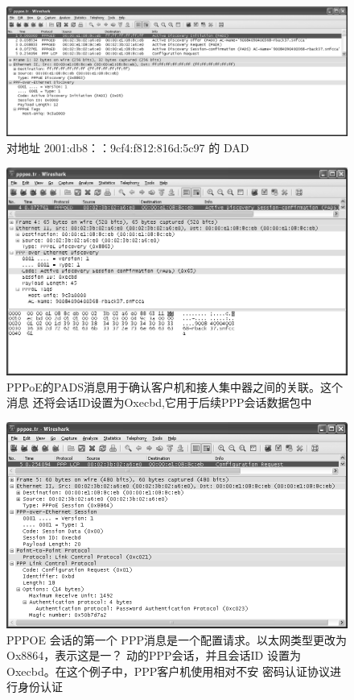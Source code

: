 \begin{figure}[H]
    \centering
	\includegraphics[scale=0.5]{imgs/6/6-31.png}
	\caption{对地址 2001:db8：：9cf4:f812:816d:5c97 的 DAD}
\end{figure}

\begin{figure}[H]
    \centering
	\includegraphics[scale=0.5]{imgs/6/6-32.png}
	\caption{PPPoE的PADS消息用于确认客户机和接人集中器之间的关联。这个消息
    还将会话ID设置为Oxecbd,它用于后续PPP会话数据包中}
\end{figure}

\begin{figure}[H]
    \centering
	\includegraphics[scale=0.5]{imgs/6/6-33.png}
	\caption{PPPOE 会话的第一个 PPP消息是一个配置请求。以太网类型更改为Ox8864，表示这是一？
    动的PPP会话，并且会话ID 设置为Oxecbd。在这个例子中，PPP客户机使用相对不安
    密码认证协议进行身份认证}
\end{figure}

